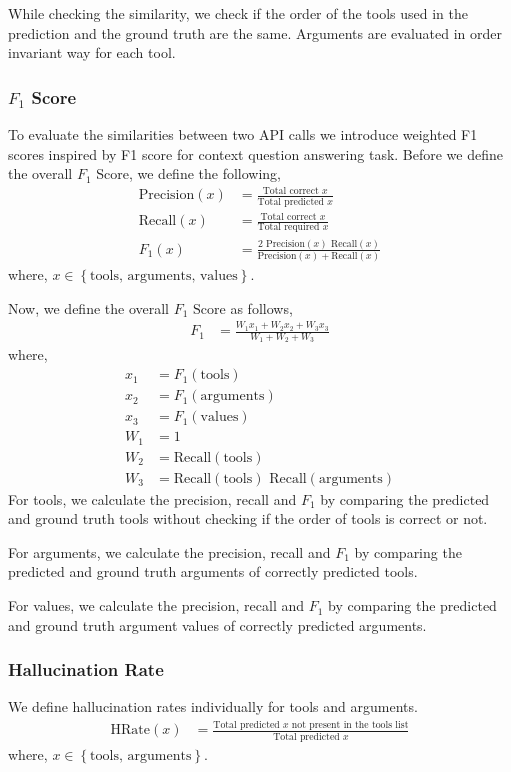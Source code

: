 \documentclass[10pt,twocolumn,letterpaper]{article}
\newcommand{\cbrak}[1]{\left\{#1\right\}}
\begin{document}
While checking the similarity, we check if the order of the tools used in the prediction and the ground truth are the same. Arguments are evaluated in order invariant way for each tool.

\subsubsection{$F_1$ Score}
To evaluate the similarities between two API calls we introduce weighted F1 scores inspired by F1 score for context question answering task.
Before we define the overall $F_1$ Score, we define the following,
\begin{align*}
    \text{Precision}(x) &= \frac{\text{Total correct } x}{\text{Total predicted } x}\\
    \text{Recall}(x) &= \frac{\text{Total correct } x}{\text{Total required } x}\\
    F_1(x) &= \frac{2\text{ Precision}(x)\text{ Recall}(x)}{\text{Precision}(x) + \text{Recall}(x)}
\end{align*}
where, $x \in \cbrak{\text{tools, arguments, values}}$.

Now, we define the overall $F_1 \text{ Score}$ as follows,
\begin{align*}
    F_1 &= \frac{W_1x_1 + W_2x_2 + W_3x_3}{W_1 + W_2 + W_3}
\end{align*}
where,
\begin{align*}
    x_1 &= F_1(\text{tools})\\
    x_2 &= F_1(\text{arguments})\\
    x_3 &= F_1(\text{values})\\
    W_1 &= 1\\
    W_2 &= \text{Recall}(\text{tools})\\
    W_3 &= \text{Recall}(\text{tools})\text{ Recall}(\text{arguments})
\end{align*}
For tools, we calculate the precision, recall and $F_1$ by comparing the predicted and ground truth tools without checking if the order of tools is correct or not.

For arguments, we calculate the precision, recall and $F_1$ by comparing the predicted and ground truth arguments of correctly predicted tools.

For values, we calculate the precision, recall and $F_1$ by comparing the predicted and ground truth argument values of correctly predicted arguments.

\subsubsection{Hallucination Rate}
We define hallucination rates individually for tools and arguments.
\begin{align*}
    \text{HRate}(x) &= \frac{\text{Total predicted $x$ not present in the tools list}}{\text{Total predicted $x$}}
\end{align*}
where, $x \in \cbrak{\text{tools, arguments}}$.
\end{document}
